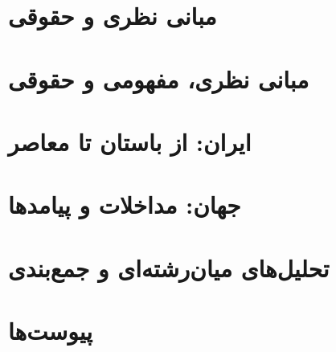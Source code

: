 \documentclass[12pt,a4paper,openright,twoside]{book}
\begin{document}
\frontmatter



\tableofcontents
\listoffigures
\listoftables



\mainmatter

\part{مبانی نظری و حقوقی}
\label{part:theory}




\part{مبانی نظری، مفهومی و حقوقی}
\label{part:duplicated}




\part{ایران: از باستان تا معاصر}
\label{part:iran}





\part{جهان: مداخلات و پیامدها}
\label{part:world}




\part{تحلیل‌های میان‌رشته‌ای و جمع‌بندی}
\label{part:analysis}










\appendix
\part{پیوست‌ها}
\label{part:appendices}






\backmatter

\end{document}
